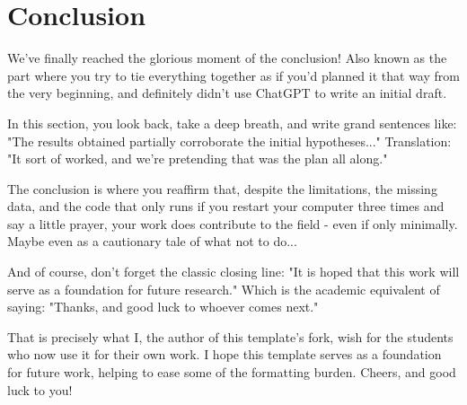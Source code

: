 \chapter{Conclusion}
\label{chap:conclusao}

We've finally reached the glorious moment of the conclusion! Also known as the part where you try to tie everything together as if you'd planned it that way from the very beginning, and definitely didn't use ChatGPT to write an initial draft.

In this section, you look back, take a deep breath, and write grand sentences like: "The results obtained partially corroborate the initial hypotheses..." Translation: "It sort of worked, and we're pretending that was the plan all along."

The conclusion is where you reaffirm that, despite the limitations, the missing data, and the code that only runs if you restart your computer three times and say a little prayer, your work does contribute to the field - even if only minimally. Maybe even as a cautionary tale of what not to do...

And of course, don't forget the classic closing line: "It is hoped that this work will serve as a foundation for future research." Which is the academic equivalent of saying: "Thanks, and good luck to whoever comes next."

That is precisely what I, the author of this template's fork, wish for the students who now use it for their own work. I hope this template serves as a foundation for future work, helping to ease some of the formatting burden. Cheers, and good luck to you!
